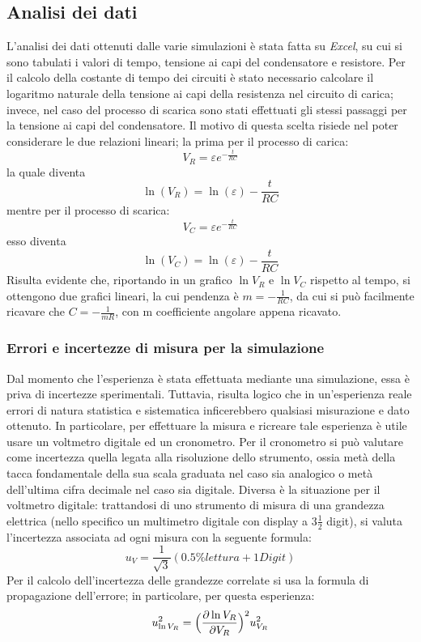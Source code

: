 \documentclass{article}
\begin{document}
\subsection{Analisi dei dati}
L'analisi dei dati ottenuti dalle varie simulazioni è stata fatta su \emph{Excel}, su cui si sono tabulati i valori di tempo, tensione ai capi del condensatore e resistore. Per il calcolo della costante di tempo dei circuiti è stato necessario calcolare il logaritmo naturale della tensione ai capi della resistenza nel circuito di carica; invece, nel caso del processo di scarica sono stati effettuati gli stessi passaggi per la tensione ai capi del condensatore. Il motivo di questa scelta risiede nel poter considerare le due relazioni lineari; la prima per il processo di carica:
\begin{equation}
    V_R = \varepsilon e^{-\frac{t}{RC}}
\end{equation}
la quale diventa
\begin{equation}
    \ln(V_R) = \ln( \varepsilon ) - \frac{t}{RC}
\end{equation}
mentre per il processo di scarica:
\begin{equation}
    V_C = \varepsilon e^{-\frac{t}{RC}}
\end{equation}
esso diventa
\begin{equation}
    \ln(V_C) = \ln( \varepsilon ) - \frac{t}{RC}
\end{equation}
Risulta evidente che, riportando in un grafico $\ln V_R$ e $\ln V_C$ rispetto al tempo, si ottengono due grafici lineari, la cui pendenza è $ m = −\frac{1}{RC}$, da cui si può facilmente ricavare che $C = - \frac{1}{mR}$, con m coefficiente angolare appena ricavato.

\subsubsection{Errori e incertezze di misura per la simulazione}
Dal momento che l'esperienza è stata effettuata mediante una simulazione, essa è priva di incertezze sperimentali. Tuttavia, risulta logico che in un’esperienza reale errori di natura statistica e sistematica inficerebbero qualsiasi misurazione e dato ottenuto. In particolare, per effettuare la misura e ricreare tale esperienza è utile usare un voltmetro digitale ed un cronometro. Per il cronometro si può valutare come incertezza quella legata alla risoluzione dello strumento, ossia metà della tacca fondamentale della sua scala graduata nel caso sia analogico o metà dell’ultima cifra decimale nel caso sia digitale. Diversa è la situazione per il voltmetro digitale: trattandosi di uno strumento di misura di una grandezza elettrica (nello specifico un multimetro digitale con display a $3\frac{1}{2}$ digit), si valuta l’incertezza associata ad ogni misura con la seguente formula:
\begin{equation}
    u_V = \frac{1}{\sqrt{3}}(0.5\% lettura + 1Digit)
\end{equation}
Per il calcolo dell’incertezza delle grandezze correlate si usa la formula di propagazione dell’errore; in particolare, per questa esperienza:
\begin{equation}
    u_{\ln V_R}^2 = \Bigl ( \frac{\partial \ln V_R}{\partial V_R} \Bigl )^2 u_{V_R}^2
\end{equation}
\end{document}
